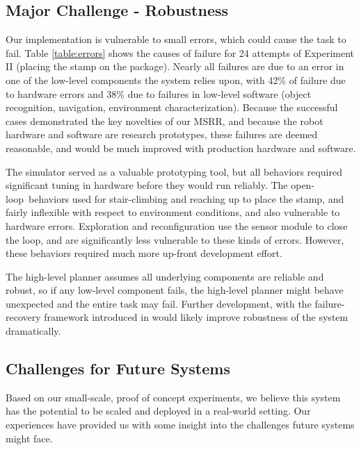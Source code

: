 \documentclass[12pt]{article}
\newcommand{\TODO}[1]{ {\bf \textcolor{red}{TODO:} #1 }}
\begin{document}
\subsection{Major Challenge - Robustness}
%
%
Our implementation is vulnerable to small errors, which could cause the task to fail. 
Table \ref{table:errors} shows the causes of failure for 24 attempts of Experiment II (placing the stamp on the package).  
Nearly all failures are due to an error in one of the low-level components the system relies upon, with
42\% of failure due to hardware errors and 38\% due to failures in low-level software (object recognition, navigation, environment characterization). Because the successful cases demonstrated the key novelties of our MSRR, and because the robot hardware and software are research prototypes, these failures are deemed reasonable, and would be much improved with production hardware and software. 

The simulator served as a valuable prototyping tool, but all behaviors required significant
tuning in hardware before they would run reliably.  
The open-loop\ behaviors used for stair-climbing and reaching up to place the stamp, and fairly
inflexible with respect to environment conditions, and also vulnerable to hardware
errors. %
Exploration and reconfiguration use the sensor module to close the
loop, and are significantly less vulnerable to these kinds of errors.  
However, these behaviors required much more up-front development effort.

The high-level planner assumes all underlying components are reliable and robust, so if any low-level component fails, the high-level planner might behave unexpected and the entire task may fail. Further development, with the failure-recovery framework introduced in \cite{Maniatopoulos16icra} would likely improve robustness of the system dramatically.

%
\subsection{Challenges for Future Systems}
%
Based on our small-scale, proof of concept experiments, we believe this system has the potential to be scaled and deployed in a real-world setting. Our experiences have provided us with some insight into the challenges future systems might face.
\end{document}
